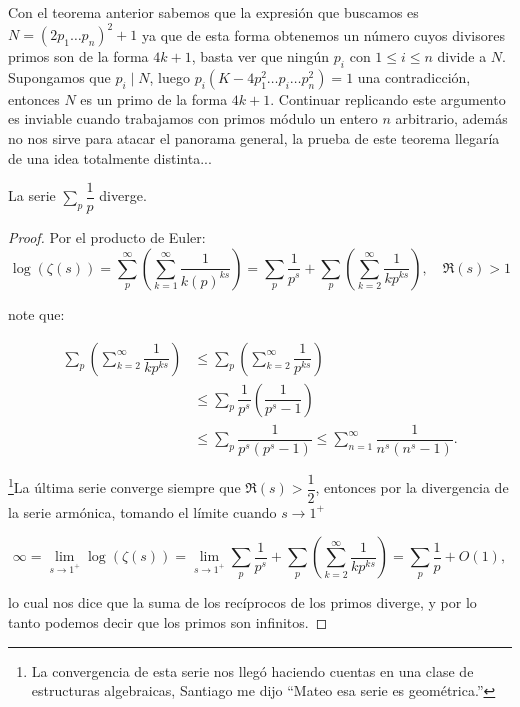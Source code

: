 Con el teorema anterior sabemos que la expresión que buscamos es $N=(2p_1\ldots p_n)^2+1$ ya que de esta forma obtenemos un número cuyos divisores primos son de la forma $4k+1$, basta ver que ningún $p_i$ con $1\leq i\leq n$ divide a $N$.\\

Supongamos que $p_i\mid N$, luego $p_i(K-4p_1^2\ldots p_i\ldots p_n^2)=1$ una contradicción, entonces $N$ es un primo de la forma $4k+1$. Continuar replicando este argumento es inviable cuando trabajamos con primos módulo un entero $n$ arbitrario, además no nos sirve para atacar el panorama general, la prueba de este teorema llegaría de una idea totalmente distinta...


\begin{theorem}[Euler]
La serie $\displaystyle\sum_p \dfrac{1}{p}$ diverge.
\end{theorem}

\begin{proof}
Por el producto de Euler:
    $$
\log (\zeta(s))=\sum_p^{\infty}\left(\displaystyle\sum_{k=1}^{\infty} \dfrac{1}{k(p)^{k s}}\right)=\sum_p
\dfrac{1}{p^s}+\sum_{p}\left(\sum_{k=2}^{\infty}\dfrac{1}{kp^{ks}}\right), \quad \Re(s)>1$$

note que:

\begin{align*}
    \sum_{p}\left(\sum_{k=2}^{\infty}\dfrac{1}{kp^{ks}}\right)&\leq \sum_{p}\left(\sum_{k=2}^{\infty}\dfrac{1}{p^{ks}}\right)\\
    &\leq\sum_{p}\dfrac{1}{p^s}\left(\dfrac{1}{p^s-1}\right)\\
    &\leq \sum_{p}\dfrac{1}{p^s(p^s-1)}\leq \sum_{n=1}^{\infty}\dfrac{1}{n^s(n^s-1)}.
\end{align*}

\footnote{La convergencia de esta serie nos llegó haciendo cuentas en una clase de estructuras algebraicas, Santiago me dijo ``Mateo esa serie es geométrica.''}La última serie converge siempre que $\Re(s)>\dfrac{1}{2}$, entonces por la divergencia de la serie armónica, tomando el límite cuando $s\to 1^+$

$$
\infty=\lim_{s\to 1^+}\log(\zeta(s))=\lim_{s\to 1^+}\sum_p
\dfrac{1}{p^s}+\sum_{p}\left(\sum_{k=2}^{\infty}\dfrac{1}{kp^{ks}}\right)=\sum_p
\dfrac{1}{p}+ O(1),$$

lo cual nos dice que la suma de los recíprocos de los primos diverge, y por lo tanto podemos decir que los primos son infinitos. 
\end{proof}

